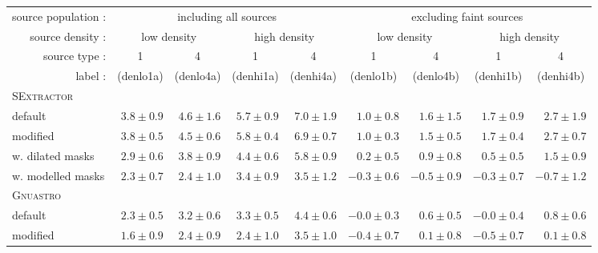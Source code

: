 \documentclass[fleqn,usenatbib,useAMS]{mnras}
\newcommand*{\SExtractor}{\textsc{SExtractor}\xspace}
\newcommand*{\Gnuastro}{\textsc{Gnuastro}\xspace}
\begin{document}
\begin{table*}
    \setlength{\tabcolsep}{5pt}
    \begin{tabular}{ l | r | r | r | r | r | r | r | r }
    \multicolumn{1}{r}{source population :} & \multicolumn{4}{c}{including all sources} & \multicolumn{4}{c}{excluding faint sources}\\
    \multicolumn{1}{r}{source density :} & \multicolumn{2}{c}{low density} & \multicolumn{2}{c}{high density} & \multicolumn{2}{c}{low density} & \multicolumn{2}{c}{high density}\\
    \multicolumn{1}{r}{source type :} & \multicolumn{1}{c}{1} & \multicolumn{1}{c}{4} & \multicolumn{1}{c}{1} & \multicolumn{1}{c}{4} & \multicolumn{1}{c}{1} & \multicolumn{1}{c}{4} & \multicolumn{1}{c}{1} & \multicolumn{1}{c}{4}\\
    \multicolumn{1}{r}{label :} & \multicolumn{1}{c}{(denlo1a)} & \multicolumn{1}{c}{(denlo4a)} & \multicolumn{1}{c}{(denhi1a)} & \multicolumn{1}{c}{(denhi4a)} & \multicolumn{1}{c}{(denlo1b)} & \multicolumn{1}{c}{(denlo4b)} & \multicolumn{1}{c}{(denhi1b)} & \multicolumn{1}{c}{(denhi4b)}\\
    \hline
    \SExtractor & & & & & & & & \\
    \hspace{25pt}default & $3.8\pm0.9$ & $4.6\pm1.6$ & $5.7\pm0.9$ & $7.0\pm1.9$ & $1.0\pm0.8$ & $1.6\pm1.5$ & $1.7\pm0.9$ & $2.7\pm1.9$\\
    \hspace{25pt}modified & $3.8\pm0.5$ & $4.5\pm0.6$ & $5.8\pm0.4$ & $6.9\pm0.7$ & $1.0\pm0.3$ & $1.5\pm0.5$ & $1.7\pm0.4$ & $2.7\pm0.7$\\
    \hspace{25pt}w. dilated masks & $2.9\pm0.6$ & $3.8\pm0.9$ & $4.4\pm0.6$ & $5.8\pm0.9$ & $0.2\pm0.5$ & $0.9\pm0.8$ & $0.5\pm0.5$ & $1.5\pm0.9$\\
    \hspace{25pt}w. modelled masks & $2.3\pm0.7$ & $2.4\pm1.0$ & $3.4\pm0.9$ & $3.5\pm1.2$ & $-0.3\pm0.6$ & $-0.5\pm0.9$ & $-0.3\pm0.7$ & $-0.7\pm1.2$\\
    \hline
    \Gnuastro & & & & & & & & \\
    \hspace{25pt}default & $2.3\pm0.5$ & $3.2\pm0.6$ & $3.3\pm0.5$ & $4.4\pm0.6$ & $-0.0\pm0.3$ & $0.6\pm0.5$ & $-0.0\pm0.4$ & $0.8\pm0.6$\\
    \hspace{25pt}modified & $1.6\pm0.9$ & $2.4\pm0.9$ & $2.4\pm1.0$ & $3.5\pm1.0$ & $-0.4\pm0.7$ & $0.1\pm0.8$ & $-0.5\pm0.7$ & $0.1\pm0.8$\\

\end{tabular}
\end{table*}
\end{document}
